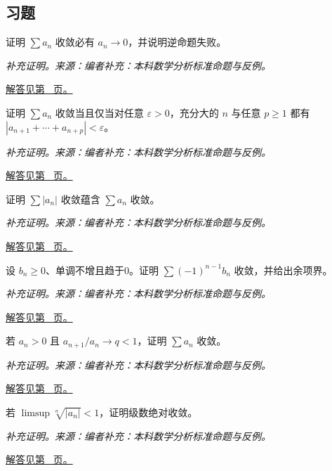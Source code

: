 \documentclass[12pt,fontset=fandol]{ctexart}
\begin{document}
\subsection{习题}
\begin{example}[级数收敛的必要条件]\label{ex:c29q1}
证明 $\sum a_n$ 收敛必有 $a_n\to0$，并说明逆命题失败。
\par\textit{补充证明。来源：编者补充：本科数学分析标准命题与反例。}\par\hyperref[ans:c29q1]{解答见第~\pageref{ans:c29q1} 页。}
\end{example}
\begin{example}\label{ex:c29q2}
证明 $\sum a_n$ 收敛当且仅当对任意 $\varepsilon>0$，充分大的 $n$ 与任意 $p\ge1$ 都有 $|a_{n+1}+\cdots+a_{n+p}|<\varepsilon$。
\par\textit{补充证明。来源：编者补充：本科数学分析标准命题与反例。}\par\hyperref[ans:c29q2]{解答见第~\pageref{ans:c29q2} 页。}
\end{example}
\begin{example}[绝对收敛定理]\label{ex:c29q3}
证明 $\sum|a_n|$ 收敛蕴含 $\sum a_n$ 收敛。
\par\textit{补充证明。来源：编者补充：本科数学分析标准命题与反例。}\par\hyperref[ans:c29q3]{解答见第~\pageref{ans:c29q3} 页。}
\end{example}
\begin{example}\label{ex:c29q4}
设 $b_n\ge0$、单调不增且趋于0。证明 $\sum(-1)^{n-1}b_n$ 收敛，并给出余项界。
\par\textit{补充证明。来源：编者补充：本科数学分析标准命题与反例。}\par\hyperref[ans:c29q4]{解答见第~\pageref{ans:c29q4} 页。}
\end{example}
\begin{example}[比值判别为何有效]\label{ex:c29q5}
若 $a_n>0$ 且 $a_{n+1}/a_n\to q<1$，证明 $\sum a_n$ 收敛。
\par\textit{补充证明。来源：编者补充：本科数学分析标准命题与反例。}\par\hyperref[ans:c29q5]{解答见第~\pageref{ans:c29q5} 页。}
\end{example}
\begin{example}[根值判别与统一指数界]\label{ex:c29q6}
若 $\limsup\sqrt[n]{|a_n|}<1$，证明级数绝对收敛。
\par\textit{补充证明。来源：编者补充：本科数学分析标准命题与反例。}\par\hyperref[ans:c29q6]{解答见第~\pageref{ans:c29q6} 页。}
\end{example}
\end{document}
